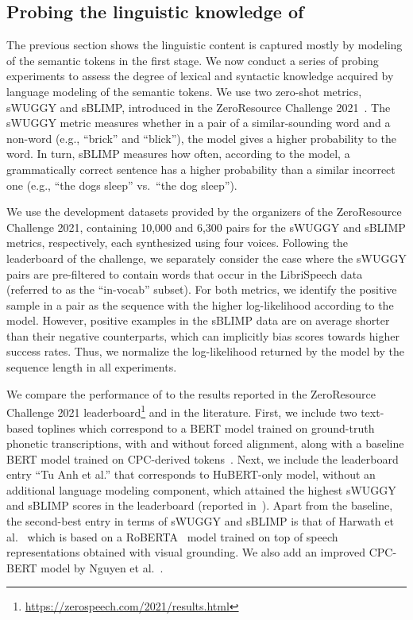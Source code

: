 \documentclass[letterpaper,10 pt]{IEEEtran}
\begin{document}
\subsection{Probing the linguistic knowledge of \ours{}}%
\label{sec:linguistic-content}
The previous section shows the linguistic content is captured mostly by modeling of the semantic tokens in the first stage. We now conduct a series of probing experiments to assess the degree of lexical and syntactic knowledge acquired by language modeling of the semantic tokens.
We use two zero-shot metrics, sWUGGY and sBLIMP, introduced in the ZeroResource Challenge 2021~\cite{zerospeech21}. The sWUGGY metric measures whether in a pair of a similar-sounding word and a non-word (e.g., ``brick'' and ``blick''), the model gives a higher probability to the word. In turn, sBLIMP measures how often, according to the model, a grammatically correct sentence has a higher probability than a similar incorrect one (e.g., ``the dogs sleep'' vs.\ ``the dog sleep''). 

We use the development datasets provided by the organizers of the ZeroResource Challenge 2021, containing 10,000 and 6,300 pairs for the sWUGGY and sBLIMP metrics, respectively, each synthesized using four voices. Following the leaderboard of the challenge, we separately consider the case where the sWUGGY pairs are pre-filtered to contain words that occur in the LibriSpeech data (referred to as the ``in-vocab'' subset).
For both metrics, we identify the positive sample in a pair as the sequence with the higher log-likelihood according to the model.
However, positive examples in the sBLIMP data are on average shorter than their negative counterparts, which can implicitly bias scores towards higher success rates. Thus, we normalize the log-likelihood returned by the model by the sequence length in all experiments.

We compare the performance of \ours{} to the results reported in the ZeroResource Challenge 2021 leaderboard\footnote{\url{https://zerospeech.com/2021/results.html}} and in the literature. First, we include two text-based toplines which correspond to a BERT model trained on ground-truth phonetic transcriptions, with and without forced alignment, along with a baseline BERT model trained on CPC-derived tokens~\cite{cpc}. Next, we include the leaderboard entry ``Tu Anh et al.'' that corresponds to HuBERT-only model, without an additional language modeling component, which attained the highest sWUGGY and sBLIMP scores in the leaderboard (reported in~\cite{nguyentextless2022}). Apart from the baseline, the second-best entry in terms of sWUGGY and sBLIMP is that of Harwath et al.~\cite{Peng2022} which is based on a RoBERTA~\cite{roberta} model trained on top of speech representations obtained with visual grounding. We also add an improved CPC-BERT model by Nguyen et al.~\cite{nguyentextless2022}.
\end{document}
